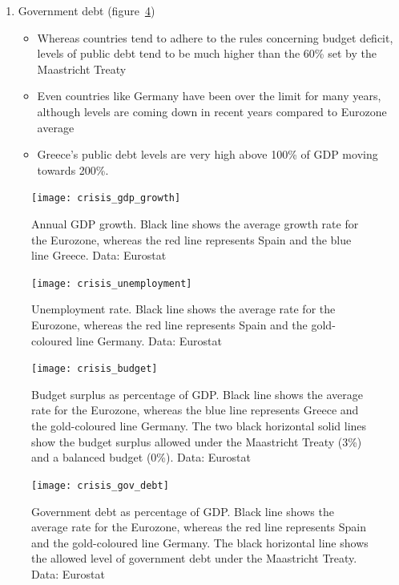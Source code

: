 \documentclass{tufte-handout}
\begin{document}
\begin{enumerate}
\begin{itemize}
  \end{itemize}
  \item Government debt (figure~\ref{fig:public_debt})
  \begin{itemize}
    \item Whereas countries tend to adhere to the rules concerning budget deficit, levels of public debt tend to be much higher than the 60\% set by the Maastricht Treaty
    \item Even countries like Germany have been over the limit for many years, although levels are coming down in recent years compared to Eurozone average
    \item Greece's public debt levels are very high above 100\% of GDP moving towards 200\%. 
  \end{itemize}
\end{enumerate}

\begin{figure}
  \texttt{[image: crisis\_gdp\_growth]}
  \caption{Annual GDP growth. Black line shows the average growth rate for the Eurozone, whereas the red line represents Spain and the blue line Greece. Data: Eurostat}
  \label{fig:gdp}
\end{figure}

\begin{figure}
  \texttt{[image: crisis\_unemployment]}
  \caption{Unemployment rate. Black line shows the average rate for the Eurozone, whereas the red line represents Spain and the gold-coloured line Germany. Data: Eurostat}
  \label{fig:unemployment}
\end{figure}

\begin{figure}
  \texttt{[image: crisis\_budget]}
  \caption{Budget surplus as percentage of GDP. Black line shows the average rate for the Eurozone, whereas the blue line represents Greece and the gold-coloured line Germany. The two black horizontal solid lines show the budget surplus allowed under the Maastricht Treaty (3\%) and a balanced budget (0\%). Data: Eurostat}
  \label{fig:budget_surplus}
\end{figure}

\begin{figure}
  \texttt{[image: crisis\_gov\_debt]}
  \caption{Government debt as percentage of GDP. Black line shows the average rate for the Eurozone, whereas the red line represents Spain and the gold-coloured line Germany. The black horizontal line shows the allowed level of government debt under the Maastricht Treaty. Data: Eurostat}
  \label{fig:public_debt}
\end{figure}
\clearpage
\end{document}
